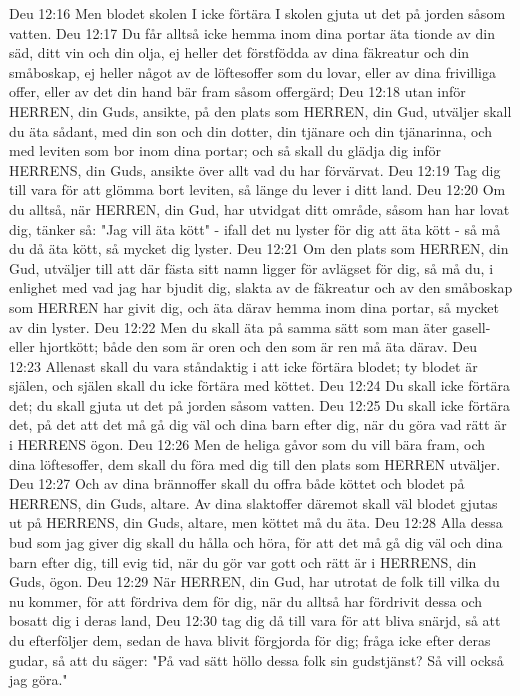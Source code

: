 Deu 12:16  Men blodet skolen I icke förtära I skolen gjuta ut det på jorden såsom vatten.
Deu 12:17  Du får alltså icke hemma inom dina portar äta tionde av din säd, ditt vin och din olja, ej heller det förstfödda av dina fäkreatur och din småboskap, ej heller något av de löftesoffer som du lovar, eller av dina frivilliga offer, eller av det din hand bär fram såsom offergärd;
Deu 12:18  utan inför HERREN, din Guds, ansikte, på den plats som HERREN, din Gud, utväljer skall du äta sådant, med din son och din dotter, din tjänare och din tjänarinna, och med leviten som bor inom dina portar; och så skall du glädja dig inför HERRENS, din Guds, ansikte över allt vad du har förvärvat.
Deu 12:19  Tag dig till vara för att glömma bort leviten, så länge du lever i ditt land.
Deu 12:20  Om du alltså, när HERREN, din Gud, har utvidgat ditt område, såsom han har lovat dig, tänker så: "Jag vill äta kött" - ifall det nu lyster för dig att äta kött - så må du då äta kött, så mycket dig lyster.
Deu 12:21  Om den plats som HERREN, din Gud, utväljer till att där fästa sitt namn ligger för avlägset för dig, så må du, i enlighet med vad jag har bjudit dig, slakta av de fäkreatur och av den småboskap som HERREN har givit dig, och äta därav hemma inom dina portar, så mycket av din lyster.
Deu 12:22  Men du skall äta på samma sätt som man äter gasell- eller hjortkött; både den som är oren och den som är ren må äta därav.
Deu 12:23  Allenast skall du vara ståndaktig i att icke förtära blodet; ty blodet är själen, och själen skall du icke förtära med köttet.
Deu 12:24  Du skall icke förtära det; du skall gjuta ut det på jorden såsom vatten.
Deu 12:25  Du skall icke förtära det, på det att det må gå dig väl och dina barn efter dig, när du göra vad rätt är i HERRENS ögon.
Deu 12:26  Men de heliga gåvor som du vill bära fram, och dina löftesoffer, dem skall du föra med dig till den plats som HERREN utväljer.
Deu 12:27  Och av dina brännoffer skall du offra både köttet och blodet på HERRENS, din Guds, altare. Av dina slaktoffer däremot skall väl blodet gjutas ut på HERRENS, din Guds, altare, men köttet må du äta.
Deu 12:28  Alla dessa bud som jag giver dig skall du hålla och höra, för att det må gå dig väl och dina barn efter dig, till evig tid, när du gör var gott och rätt är i HERRENS, din Guds, ögon.
Deu 12:29  När HERREN, din Gud, har utrotat de folk till vilka du nu kommer, för att fördriva dem för dig, när du alltså har fördrivit dessa och bosatt dig i deras land,
Deu 12:30  tag dig då till vara för att bliva snärjd, så att du efterföljer dem, sedan de hava blivit förgjorda för dig; fråga icke efter deras gudar, så att du säger: "På vad sätt höllo dessa folk sin gudstjänst? Så vill också jag göra."

